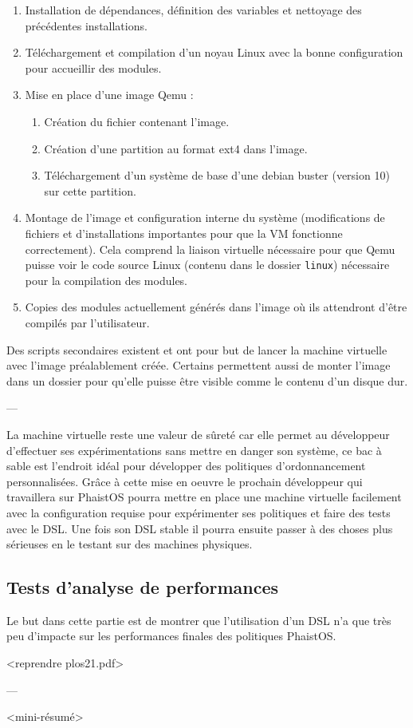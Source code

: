 \begin{enumerate}
    \item Installation de dépendances, définition des variables et nettoyage 
    des précédentes installations.
    \item Téléchargement et compilation d'un noyau Linux avec la bonne 
    configuration pour accueillir des modules.
    \item Mise en place d'une image Qemu :
    \begin{enumerate}
        \item Création du fichier contenant l'image.
        \item Création d'une partition au format ext4 dans l'image.
        \item Téléchargement d'un système de base d'une debian buster (version 
        10) sur cette partition.
    \end{enumerate}
    \item Montage de l'image et configuration interne du système (modifications 
    de fichiers et d'installations importantes pour que la VM fonctionne 
    correctement). Cela comprend la liaison virtuelle nécessaire pour que Qemu 
    puisse voir le code source Linux (contenu dans le dossier \texttt{linux}) 
    nécessaire pour la compilation des modules.
    \item Copies des modules actuellement générés dans l'image où ils 
    attendront d'être compilés par l'utilisateur.
\end{enumerate}

Des scripts secondaires existent et ont pour but de lancer la machine virtuelle 
avec l'image préalablement créée. Certains permettent aussi de monter l'image 
dans un dossier pour qu'elle puisse être visible comme le contenu d'un disque 
dur.

\begin{center}
---
\end{center}
    
La machine virtuelle reste une valeur de sûreté car elle permet au développeur 
d'effectuer ses expérimentations sans mettre en danger son système, ce bac à 
sable est l'endroit idéal pour développer des politiques d'ordonnancement 
personnalisées. Grâce à cette mise en oeuvre le prochain développeur qui 
travaillera sur PhaistOS pourra mettre en place une machine virtuelle 
facilement avec la configuration requise pour expérimenter ses politiques et 
faire des tests avec le DSL. Une fois son DSL stable il pourra ensuite passer à 
des choses plus sérieuses en le testant sur des machines physiques.

\subsection{Tests d'analyse de performances}

Le but dans cette partie est de montrer que l'utilisation d'un DSL n'a que très 
peu d'impacte sur les performances finales des politiques PhaistOS.

<reprendre plos21.pdf>

\begin{center}
---
\end{center}
    
<mini-résumé>
